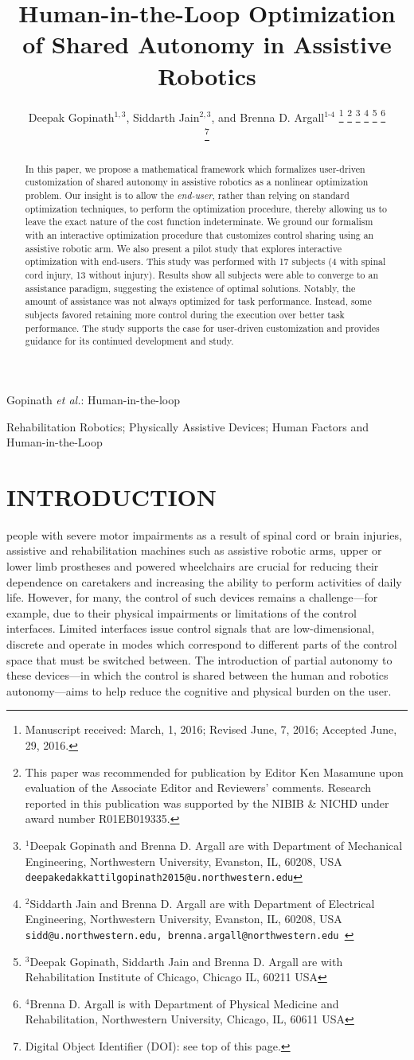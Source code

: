 \documentclass[letterpaper, 10 pt, journal, twoside]{IEEEtran}  %
\title{
	Human-in-the-Loop Optimization of Shared Autonomy in Assistive Robotics
}
\author{Deepak Gopinath$^{1,3}$, Siddarth Jain$^{2,3}$, and Brenna D. Argall$^{1\text{-}4}$%
	\thanks{Manuscript received: March, 1, 2016; Revised June,
		7, 2016; Accepted June, 29, 2016.}%
	\thanks{This paper was recommended for publication by Editor
		Ken Masamune upon evaluation of the Associate Editor and
		Reviewers' comments. Research reported in this publication was supported by the
		NIBIB \& NICHD
		under award number R01EB019335.}%
	\thanks{$^{1}$Deepak Gopinath and Brenna D. Argall are with Department of Mechanical Engineering, Northwestern University, Evanston, IL, 60208, USA
		{\tt\small deepakedakkattilgopinath2015@u.northwestern.edu}}%
	\thanks{$^{2} $Siddarth Jain and Brenna D. Argall are with Department of Electrical Engineering, Northwestern University, Evanston, IL, 60208, USA {\tt\small sidd@u.northwestern.edu, brenna.argall@northwestern.edu }}%
	\thanks{$^{3} $Deepak Gopinath, Siddarth Jain and Brenna D. Argall are with Rehabilitation Institute of Chicago, Chicago IL, 60211 USA}%
	\thanks{$^{4} $Brenna D. Argall is with Department of Physical Medicine and Rehabilitation, Northwestern University, Chicago, IL, 60611 USA}%

	\thanks{Digital Object Identifier (DOI): see top of this page.}
}
\begin{document}
	\maketitle
	{Gopinath \MakeLowercase{\textit{et al.}}:
		Human-in-the-loop}
	
	
		\begin{abstract}
			In this paper, we propose a mathematical framework which formalizes user-driven customization of shared autonomy in assistive robotics as a nonlinear optimization problem. 
			Our insight is to allow the \textit{end-user}, rather than relying on standard optimization techniques, to perform the optimization procedure, thereby allowing us to leave the exact nature of the cost function indeterminate.
			We ground our formalism with an interactive
			optimization procedure that customizes
			control sharing using an assistive robotic arm. We also present
			a pilot study that explores interactive optimization with
			end-users.
			This study was performed with 17 subjects (4 with spinal cord injury, 13 without injury). Results
			show all subjects were able to converge to an assistance paradigm, suggesting the existence of optimal solutions. Notably, the amount of assistance was not always
			optimized for task performance. Instead, some subjects
			favored retaining more control during the execution over better task
			performance.
			The study supports the case for user-driven customization and provides
			guidance for its continued development and study.
		\end{abstract}
	\begin{IEEEkeywords}
	Rehabilitation Robotics; Physically Assistive Devices; Human Factors and Human-in-the-Loop
	\end{IEEEkeywords}
		
	\section{INTRODUCTION} \label{Intro}
	
	 people with severe motor impairments as a result of spinal cord or
	brain injuries, assistive and rehabilitation machines such as
	assistive robotic arms, upper or lower limb prostheses and powered
	wheelchairs are crucial for reducing their dependence on caretakers
	and increasing the ability to perform activities of daily life. 
	However, for many, the control of such devices remains a
	challenge---for example, due to their physical impairments or limitations of the control interfaces. Limited interfaces issue control signals that are low-dimensional, discrete and operate in modes which correspond to different parts of the control space that must be switched between. The introduction of
	partial autonomy to these devices---in which the control is shared
	between the human and robotics autonomy---aims to help reduce the cognitive and physical burden on the user. 
	
\end{document}
